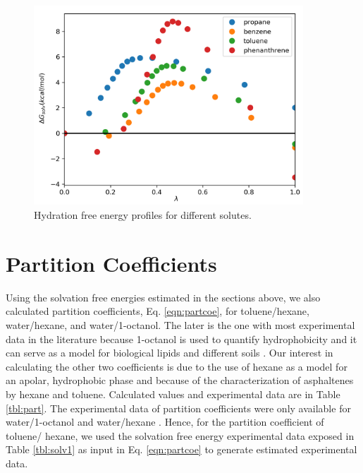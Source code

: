 \begin{figure}[H]
\centering
\includegraphics[width=0.9\textwidth]{Figures/water}
\caption{Hydration free energy profiles for different solutes.}
\label{fig:water}
\end{figure}

\section{Partition Coefficients}

Using the solvation free energies estimated in the sections above, we also calculated partition coefficients, Eq. \eqref{eqn:partcoe}, for toluene/hexane, water/hexane, and water/1-octanol. The later is the one with most experimental data in the literature because 1-octanol is used to quantify hydrophobicity and it can serve as a model for biological lipids and different soils \cite{RUELLE2000457}. Our interest in calculating the other two coefficients is due to the use of hexane as a model for an apolar, hydrophobic phase and because of the characterization of asphaltenes by hexane and toluene. Calculated values and experimental data are in Table \ref{tbl:part}. The experimental data of partition coefficients  were only available for water/1-octanol  \cite{POOLE2000117,sangster} and water/hexane \cite{doi:10.1021/je970112e}. Hence, for the partition coefficient of toluene/ hexane, we used the solvation free energy experimental data exposed in Table \ref{tbl:solv1} as input in Eq. \eqref{eqn:partcoe} to generate estimated experimental data.


